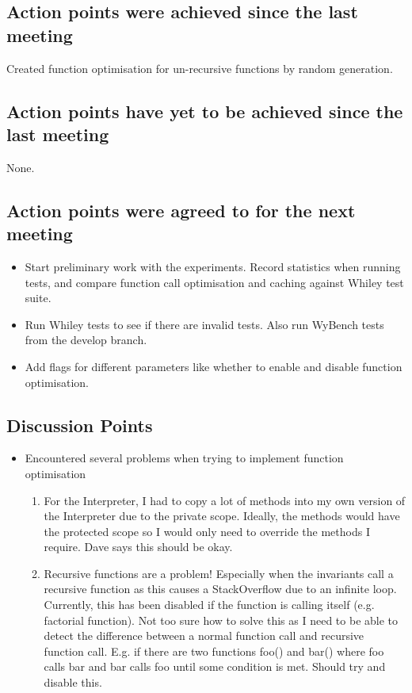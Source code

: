 \documentclass[]{article}
\begin{document}
\subsection{Action points were achieved since the last meeting}
 Created function optimisation for un-recursive functions by random generation.
\subsection{Action points have yet to be achieved since the last meeting}
None.
\subsection{Action points were agreed to for the next meeting}

\begin{itemize}
	\item Start preliminary work with the experiments. Record statistics when running tests, and compare function call optimisation and caching against Whiley test suite.
	\item Run Whiley tests to see if there are invalid tests. Also run WyBench tests from the develop branch.
	\item Add flags for different parameters like whether to enable and disable function optimisation.
\end{itemize}

\subsection{Discussion Points}
\begin{itemize}
 \item Encountered several problems when trying to implement function optimisation
 \begin{enumerate}
 	\item For the Interpreter, I had to copy a lot of methods into my own version of the Interpreter due to the private scope.
 	Ideally, the methods would have the protected scope so I would only need to override the methods I require.
 	Dave says this should be okay.
 	\item Recursive functions are a problem! Especially when the invariants call a recursive function as this causes a StackOverflow due to an infinite loop. Currently, this has been disabled if the function is calling itself (e.g. factorial function).
 	Not too sure how to solve this as I need to be able to detect the difference between a normal function call and recursive function call. 
 	E.g. if there are two functions foo() and bar() where foo calls bar and bar calls foo until some condition is met.
 	Should try and disable this.
 \end{enumerate}
\end{itemize}
\end{document}
